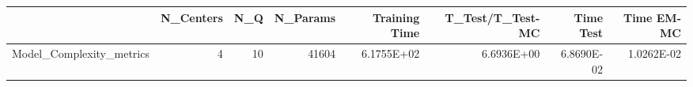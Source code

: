 \begin{tabular}{lrrrrrrr}
\toprule
{} &  N\_Centers &  N\_Q &  N\_Params &  Training Time &  T\_Test/T\_Test-MC &  Time Test &  Time EM-MC \\
\midrule
Model\_Complexity\_metrics &          4 &   10 &     41604 &     6.1755E+02 &        6.6936E+00 & 6.8690E-02 &  1.0262E-02 \\
\bottomrule
\end{tabular}

